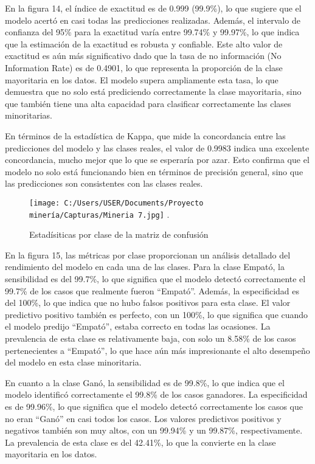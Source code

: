 \documentclass[conference,final,]{IEEEtran}
\begin{document}
En la figura 14, el índice de exactitud es de 0.999 (99.9\%), lo que
sugiere que el modelo acertó en casi todas las predicciones realizadas.
Además, el intervalo de confianza del 95\% para la exactitud varía entre
99.74\% y 99.97\%, lo que indica que la estimación de la exactitud es
robusta y confiable. Este alto valor de exactitud es aún más
significativo dado que la tasa de no información (No Information Rate)
es de 0.4901, lo que representa la proporción de la clase mayoritaria en
los datos. El modelo supera ampliamente esta tasa, lo que demuestra que
no solo está prediciendo correctamente la clase mayoritaria, sino que
también tiene una alta capacidad para clasificar correctamente las
clases minoritarias.

En términos de la estadística de Kappa, que mide la concordancia entre
las predicciones del modelo y las clases reales, el valor de 0.9983
indica una excelente concordancia, mucho mejor que lo que se esperaría
por azar. Esto confirma que el modelo no solo está funcionando bien en
términos de precisión general, sino que las predicciones son
consistentes con las clases reales.

\begin{figure}[htbp]
\centering
\texttt{[image: C:/Users/USER/Documents/Proyecto minería/Capturas/Mineria 7.jpg]}
\DeclareGraphicsExtensions.
\caption{Estadísiticas por clase de la matriz de confusión}
\label{Mineria 7}
\end{figure}

En la figura 15, las métricas por clase proporcionan un análisis
detallado del rendimiento del modelo en cada una de las clases. Para la
clase Empató, la sensibilidad es del 99.7\%, lo que significa que el
modelo detectó correctamente el 99.7\% de los casos que realmente fueron
``Empató''. Además, la especificidad es del 100\%, lo que indica que no
hubo falsos positivos para esta clase. El valor predictivo positivo
también es perfecto, con un 100\%, lo que significa que cuando el modelo
predijo ``Empató'', estaba correcto en todas las ocasiones. La
prevalencia de esta clase es relativamente baja, con solo un 8.58\% de
los casos pertenecientes a ``Empató'', lo que hace aún más impresionante
el alto desempeño del modelo en esta clase minoritaria.

En cuanto a la clase Ganó, la sensibilidad es de 99.8\%, lo que indica
que el modelo identificó correctamente el 99.8\% de los casos ganadores.
La especificidad es de 99.96\%, lo que significa que el modelo detectó
correctamente los casos que no eran ``Ganó'' en casi todos los casos.
Los valores predictivos positivos y negativos también son muy altos, con
un 99.94\% y un 99.87\%, respectivamente. La prevalencia de esta clase
es del 42.41\%, lo que la convierte en la clase mayoritaria en los
datos.
\end{document}
